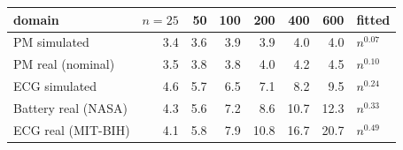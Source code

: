 \begin{tabular}{lrrrrrrl}
\toprule
domain & $n{=}25$ & 50 & 100 & 200 & 400 & 600 & fitted \\
\midrule
PM simulated & 3.4 & 3.6 & 3.9 & 3.9 & 4.0 & 4.0 & $n^{0.07}$ \\
PM real (nominal) & 3.5 & 3.8 & 3.8 & 4.0 & 4.2 & 4.5 & $n^{0.10}$ \\
ECG simulated & 4.6 & 5.7 & 6.5 & 7.1 & 8.2 & 9.5 & $n^{0.24}$ \\
Battery real (NASA) & 4.3 & 5.6 & 7.2 & 8.6 & 10.7 & 12.3 & $n^{0.33}$ \\
ECG real (MIT-BIH) & 4.1 & 5.8 & 7.9 & 10.8 & 16.7 & 20.7 & $n^{0.49}$ \\
\bottomrule
\end{tabular}
